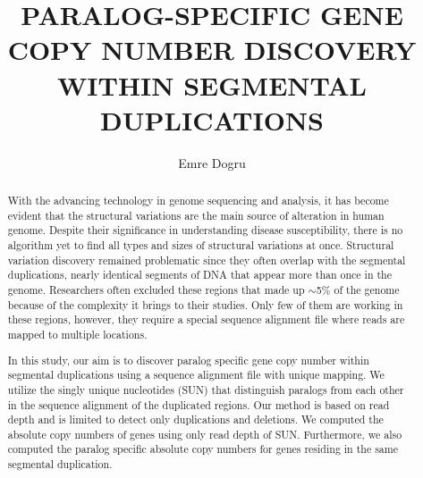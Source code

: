 \documentclass{buthesis}
\title{PARALOG-SPECIFIC GENE COPY NUMBER DISCOVERY WITHIN SEGMENTAL DUPLICATIONS}
\author{Emre Dogru}
\begin{document}
\titlepageMS %
\signaturepageMS %

\thispagestyle{plain}
\begin{abstract}
With the advancing technology in genome sequencing and analysis, it has become evident that the structural variations are the main source of alteration in human genome. Despite their significance in understanding disease susceptibility, there is no algorithm yet to find all types and sizes of structural variations at once. Structural variation discovery remained problematic since they often overlap with the segmental duplications, nearly identical segments of DNA that appear more than once in the genome. Researchers often excluded these regions that made up $\sim$5\% of the genome because of the complexity it brings to their studies. Only few of them are working in these regions, however, they require a special sequence alignment file where reads are mapped to multiple locations.

In this study, our aim is to discover paralog specific gene copy number within segmental duplications using a sequence alignment file with unique mapping. We utilize the singly unique nucleotides (SUN) that distinguish paralogs from each other in the sequence alignment of the duplicated regions. Our method is based on read depth and is limited to detect only duplications and deletions. We computed the absolute copy numbers of genes using only read depth of SUN. Furthermore, we also computed the paralog specific absolute copy numbers for genes residing in the same segmental duplication.


\end{abstract}
\end{document}
